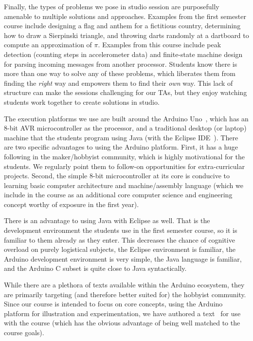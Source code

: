 Finally, the types of problems we pose in studio session are purposefully
amenable to multiple solutions and approaches.  Examples from the
first semester course include designing
a flag and anthem for a fictitious country, determining how to draw a Sierpinski
triangle, and throwing darts randomly at a dartboard to compute an approximation
of $\pi$.
Examples from this course include peak detection (counting steps in
accelerometer data) and finite-state machine design for parsing
incoming messages from another processor.
Students know there is more than one way to solve any of these
problems, which liberates them from finding the \emph{right} way and
empowers them to find their \emph{own} way.  This lack of structure can make
the sessions challenging for our TAs, but they enjoy watching students work
together to create solutions in studio.












The execution platforms we use are built around the Arduino Uno~\cite{arduino},
which has an 8-bit AVR microcontroller as the processor,
and a traditional desktop (or laptop) machine that the
students program using Java (with the Eclipse IDE~\cite{eclipse}).
There are two specific advantages to using the Arduino platform.
First, it has a huge following in the maker/hobbyist community, which
is highly motivational for the students.  We regularly point them to
follow-on opportunities for extra-curricular projects.
Second, the simple 8-bit microcontroller at its core is conducive to
learning basic computer architecture and machine/assembly language
(which we include in the course as an additional core computer
science and engineering concept worthy of exposure in the first year).

There is an advantage to using Java with Eclipse as well. That is the
development environment the students use in the first semester course, so
it is familiar to them already as they enter.  This decreases the chance
of cognitive overload on purely logistical subjects, the Eclipse environment
is familiar, the Arduino development environment is very simple, the
Java language is familiar, and the Arduino C subset is quite close to
Java syntactically.

While there are a plethora of texts available within the Arduino
ecosystem, they are primarily targeting (and therefore better suited for)
the hobbyist community. Since
our course is intended to focus on core concepts, using the
Arduino platform for illustration and experimentation, we have authored
a text~\cite{cc17} for use with the course (which has the obvious
advantage of being well matched to the course goals).


